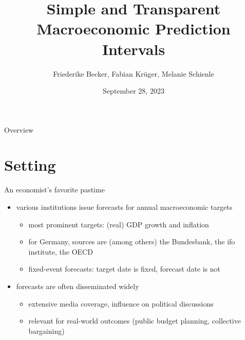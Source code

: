 \documentclass[en]{sdqbeamer}
\title[Simple Prediction Intervals]{Simple and Transparent Macroeconomic Prediction Intervals}
\subtitle{}
\author[Friederike Becker, Fabian Krüger, Melanie Schienle]{Friederike Becker, Fabian Krüger, Melanie Schienle}
\date[28.\,9.\,2023]{September 28, 2023}
\begin{document}
 
\KITtitleframe

\begin{frame}{Overview}
\tableofcontents
\end{frame}

\section{Setting}


\begin{frame}{An economist's favorite pastime}
	\begin{itemize}
	    \item various institutions issue forecasts for annual macroeconomic targets
     \begin{itemize}
        \item most prominent targets: (real) GDP growth and inflation
        \item for Germany, sources are (among others) the Bundesbank, the ifo institute, the OECD
         \item fixed-event forecasts: target date is fixed, forecast date is not
     \end{itemize}
     \item forecasts are often disseminated widely
     \begin{itemize}
         \item extensive media coverage, influence on political discussions
         \item relevant for real-world outcomes (public budget planning, collective bargaining)
     \end{itemize}
	\end{itemize}
\end{frame}
\end{document}
